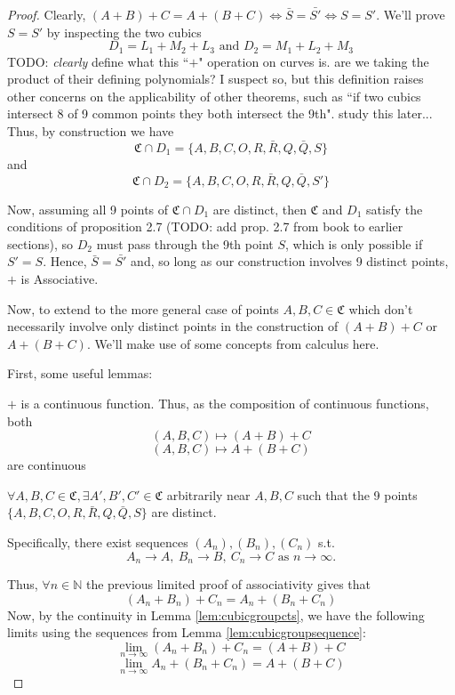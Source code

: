 \begin{proof}
Clearly, $(A+B)+C = A+(B+C) \iff \bar{S}=\bar{S'} \iff S=S'$. We'll prove $S=S'$ by inspecting the two cubics
\[
	D_1 = L_1 + M_2 + L_3 \text{ and } D_2 = M_1 + L_2 + M_3
\]
TODO: \emph{clearly} define what this ``$+$" operation on curves is. are we
taking the product of their defining polynomials? I suspect so, but
this definition raises other concerns on the applicability of other theorems,
such as ``if two cubics intersect 8 of 9 common points they both intersect the 9th".
study this later...\\

Thus, by construction we have
\[
	\mathfrak{C} \cap D_1 = \{A, B, C, O, R, \bar{R}, Q, \bar{Q}, S\}
\]
and
\[
	\mathfrak{C} \cap D_2 = \{A, B, C, O, R, \bar{R}, Q, \bar{Q}, S'\}
\]

Now, assuming all 9 points of $\mathfrak{C} \cap D_1$ are distinct, then $\mathfrak{C}$ and $D_1$
satisfy the conditions of proposition 2.7 (TODO: add prop. 2.7 from book to earlier sections),
so $D_2$ must pass through the 9th point $S$, which is only possible if $S'=S$.
Hence, $\bar{S} = \bar{S'}$ and, so long as our construction involves 9 distinct points,
$+$ is Associative.

Now, to extend to the more general case of points $A,B,C \in \mathfrak{C}$
which don't necessarily involve only distinct points in the construction
of $(A+B)+C$ or $A+(B+C)$. We'll make use of some concepts from calculus here.

First, some useful lemmas:
\begin{lemma}
\label{lem:cubicgroupcts}
$+$ is a continuous function. Thus, as the composition of continuous functions, both
\[
(A,B,C) \mapsto (A+B)+C
\]
\[
(A,B,C) \mapsto A+(B+C)
\]
are continuous
\end{lemma}

\begin{lemma}
\label{lem:cubicgroupsequence}
$\forall A,B,C \in \mathfrak{C}, \exists A',B',C' \in \mathfrak{C}$ arbitrarily near $A,B,C$
such that the 9 points $\{A,B,C,O,R,\bar{R},Q,\bar{Q},S\}$ are distinct.

Specifically, there exist sequences $(A_n), (B_n), (C_n)$ s.t.
\[
A_n \to A,~B_n \to B,~C_n \to C \text{ as } n \to \infty.
\]
\end{lemma}

Thus, $\forall n \in \mathbb{N}$ the previous limited proof of associativity gives
that 
\[
	(A_n+B_n)+C_n = A_n+(B_n+C_n) \tag{*}
\]
Now, by the continuity in Lemma \ref{lem:cubicgroupcts},
we have the following limits using the sequences from Lemma \ref{lem:cubicgroupsequence}:
\[
	\lim_{n \to \infty} (A_n + B_n) + C_n = (A+B)+C
\]
\[
	\lim_{n \to \infty} A_n + (B_n + C_n) = A+(B+C)
\]


\end{proof}
